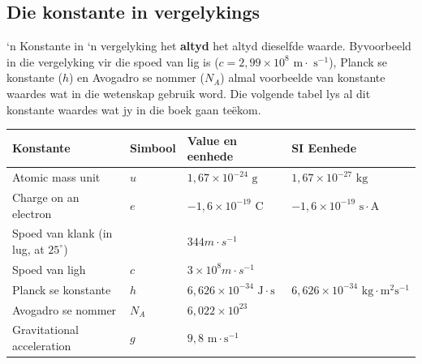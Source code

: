 \subsection*{Die konstante in vergelykings}
‘n Konstante in ‘n vergelyking het \textbf{altyd} het altyd dieselfde waarde. Byvoorbeeld in die vergelyking vir die spoed van lig is ($c = 2,99 \times 10^{8} \text{ m} \cdot \text{ s}^{-1}$), Planck se konstante ($h$) en Avogadro se nommer ($N_A$) almal voorbeelde van konstante waardes wat in die wetenskap gebruik word. Die volgende tabel lys al dit konstante waardes wat jy in die boek gaan teëkom.
\begin{table}[H]
 \begin{center}
  \begin{tabular}{|l|l|l|l|}\hline
   \textbf{Konstante} & Simbool & \textbf{Value en eenhede} & \textbf{SI Eenhede} \\ \hline
Atomic mass unit & $u$ & $1,67 \times 10^{-24} \text{ g}$ & $1,67 \times 10^{-27} \text{ kg}$ \\ \hline
Charge on an electron & $e$ & $-1,6 \times 10^{-19} \text{ C}$ & $-1,6 \times 10^{-19} \text{ s}\cdot \text{A}$ \\ \hline
Spoed van klank (in lug, at $25^{\circ}$) & & \multicolumn{2}{l|}{$344 m \cdot s^{-1}$} \\ \hline
Spoed van ligh & $c$ & \multicolumn{2}{l|}{$3 \times 10^{8} m \cdot s^{-1}$} \\ \hline
Planck se konstante & $h$ & $6,626 \times 10^{-34} \text{ J} \cdot \text{s}$ & $6,626 \times 10^{-34} \text{ kg} \cdot \text{m}^{2} \text{s}^{-1}$ \\ \hline
Avogadro se nommer & $N_{A}$ & \multicolumn{2}{l|}{$6,022 \times 10^{23}$} \\ \hline
Gravitational acceleration & $g$ & \multicolumn{2}{l|}{$9,8 \text{ m} \cdot \text{s}^{-1}$} \\ \hline  
  \end{tabular}
 \end{center}
\end{table}

